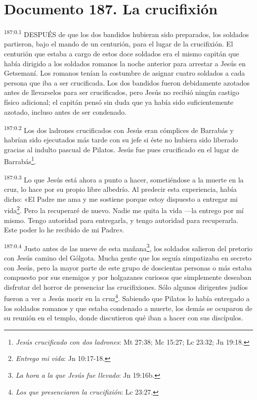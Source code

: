 \chapter{Documento 187. La crucifixión}
\par
\textsuperscript{187:0.1} DESPUÉS de que los dos bandidos hubieran sido preparados, los soldados partieron, bajo el mando de un centurión, para el lugar de la crucifixión. El centurión que estaba a cargo de estos doce soldados era el mismo capitán que había dirigido a los soldados romanos la noche anterior para arrestar a Jesús en Getsemaní. Los romanos tenían la costumbre de asignar cuatro soldados a cada persona que iba a ser crucificada. Los dos bandidos fueron debidamente azotados antes de llevarselos para ser crucificados, pero Jesús no recibió ningún castigo físico adicional; el capitán pensó sin duda que ya había sido suficientemente azotado, incluso antes de ser condenado.

\par
\textsuperscript{187:0.2} Los dos ladrones crucificados con Jesús eran cómplices de Barrabás y habrían sido ejecutados más tarde con su jefe si éste no hubiera sido liberado gracias al indulto pascual de Pilatos. Jesús fue pues crucificado en el lugar de Barrabás\footnote{\textit{Jesús crucificado con dos ladrones}: Mt 27:38; Mc 15:27; Lc 23:32; Jn 19:18.}.

\par
\textsuperscript{187:0.3} Lo que Jesús está ahora a punto a hacer, sometiéndose a la muerte en la cruz, lo hace por su propio libre albedrío. Al predecir esta experiencia, había dicho: «El Padre me ama y me sostiene porque estoy dispuesto a entregar mi vida\footnote{\textit{Entrego mi vida}: Jn 10:17-18.}. Pero la recuperaré de nuevo. Nadie me quita la vida ---la entrego por mí mismo. Tengo autoridad para entregarla, y tengo autoridad para recuperarla. Este poder lo he recibido de mi Padre».

\par
\textsuperscript{187:0.4} Justo antes de las nueve de esta mañana\footnote{\textit{La hora a la que Jesús fue llevado}: Jn 19:16b.}, los soldados salieron del pretorio con Jesús camino del Gólgota. Mucha gente que los seguía simpatizaba en secreto con Jesús, pero la mayor parte de este grupo de doscientas personas o más estaba compuesto por sus enemigos y por holgazanes curiosos que simplemente deseaban disfrutar del horror de presenciar las crucifixiones. Sólo algunos dirigentes judíos fueron a ver a Jesús morir en la cruz\footnote{\textit{Los que presenciaron la crucifixión}: Lc 23:27.}. Sabiendo que Pilatos lo había entregado a los soldados romanos y que estaba condenado a muerte, los demás se ocuparon de su reunión en el templo, donde discutieron qué iban a hacer con sus discípulos.

